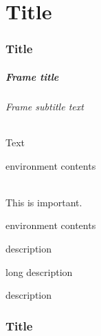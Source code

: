 \documentclass[compress,red,notheorems]{beamer}
\theoremstyle{definition}
\newtheorem{definition}{Тодорхойлолт}
\newtheorem{example}{Жишээ}
\newtheorem{problem}{Бодлого}
\theoremstyle{remark}
\begin{document}

\part{Title}

\section[Short title]{Title}

\begin{frame}
\frametitle{Frame title}\framesubtitle{Frame subtitle text}
 Text
\\[1em]
\begin{structureenv}
environment contents
\end{structureenv}
\\[1em]
This is \alert{important}.
\\[1em]
\begin{alertenv}
environment contents
\end{alertenv}
\vspace{1em}
\begin{description}
\item[label] description
\item[long label] long description
\item[longest label] description
\end{description}
\end{frame}

\section[Short title]{Title}
\end{document}
